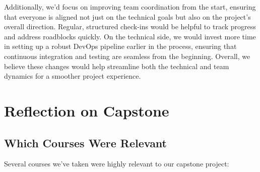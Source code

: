 \documentclass{article}
\begin{document}
Additionally, we’d focus on improving team coordination from the start, ensuring that 
everyone is aligned not just on the technical goals but also on the project’s overall 
direction. Regular, structured check-ins would be helpful to track progress and address 
roadblocks quickly. On the technical side, we would invest more time in setting up a robust
DevOps pipeline earlier in the process, ensuring that continuous integration and testing are 
seamless from the beginning. Overall, we believe these changes would help streamline both the 
technical and team dynamics for a smoother project experience.

\section{Reflection on Capstone}


\subsection{Which Courses Were Relevant}

Several courses we’ve taken were highly relevant to our capstone project:
\end{document}
